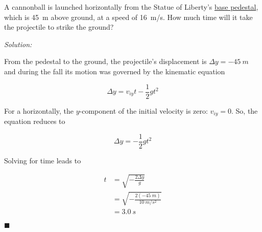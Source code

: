 \documentclass[dvipsnames]{article}
\begin{document}
\begin{example} \label{ER19WG}
    A cannonball is launched horizontally from the Statue of Liberty's \href{https://www.nps.gov/stli/planyourvisit/images/Statue-from-Fort-Wood-up-3_1.jpg?maxwidth=1300&maxheight=1300&autorotate=false}{base pedestal}, which is \SI{45}{m} above ground, at a speed of \SI{16}{m/s}. How much time will it take the projectile to strike the ground?

\begin{center}
\end{center}
\end{example}

\textit{Solution:}

From the pedestal to the ground, the projectile's displacement is $\Delta y = \SI{-45}{m}$ and during the fall its motion was governed by the kinematic equation

\begin{equation*}
    \Delta y = v_{iy} t - \frac{1}{2} g t^2
\end{equation*}

For a horizontally, the $y$-component of the initial velocity is zero: $v_{iy} = 0$. So, the equation reduces to

\begin{equation*}
    \Delta y = -\frac{1}{2}gt^2
\end{equation*}

Solving for time leads to

\begin{align*}
    t &= \sqrt{-\frac{2\Delta y}{g}} \\[1ex]
    &= \sqrt{-\frac{2(-\SI{45}{m})}{\SI{10}{m/s^2}}} \\[1ex]
    &= \boxed{\SI{3.0}{s}}
\end{align*}

\hfill $\blacksquare$
\end{document}
